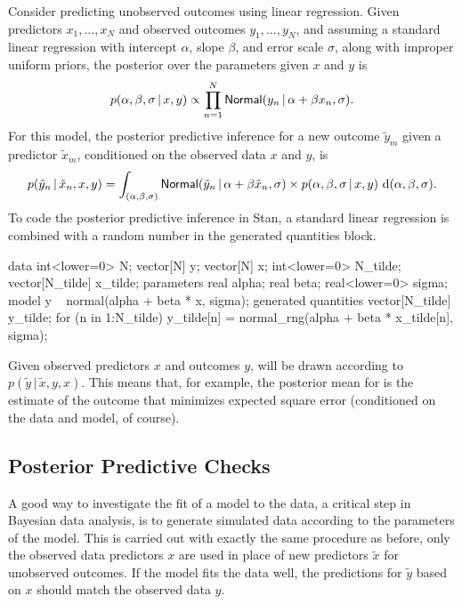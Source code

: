 Consider predicting unobserved outcomes using linear
regression.  Given predictors $x_1, \ldots, x_N$ and observed outcomes
$y_1,\ldots,y_N$, and assuming a standard linear regression with
intercept $\alpha$, slope $\beta$, and error scale $\sigma$, along with
improper uniform priors, the posterior over the parameters given $x$
and $y$ is
%
\[
p(\alpha, \beta, \sigma \, | \, x, y) 
\propto 
\prod_{n=1}^N 
  \distro{Normal}(y_n \, | \, \alpha + \beta x_n, \sigma).
\]
%
For this model, the posterior predictive inference for a new outcome
$\tilde{y}_m$ given a predictor $\tilde{x}_m$, conditioned on the
observed data $x$ and $y$, is
\[
p(\tilde{y}_n \, | \, \tilde{x}_n, x, y)
= \int_{(\alpha,\beta,\sigma)}
  \distro{Normal}(\tilde{y}_n \, | \, \alpha + \beta \tilde{x}_n, \sigma)
  \times
  p(\alpha, \beta, \sigma \, | \, x, y) 
  \
  \mathrm{d}(\alpha,\beta,\sigma).
\]
%
To code the posterior predictive inference in Stan, a standard linear
regression is combined with a random number in the generated
quantities block.
%
\begin{stancode}
data {
  int<lower=0> N;
  vector[N] y;
  vector[N] x;
  int<lower=0> N_tilde;
  vector[N_tilde] x_tilde;
}
parameters {
  real alpha;
  real beta;
  real<lower=0> sigma;
}
model {
  y ~ normal(alpha + beta * x, sigma);
}
generated quantities {
  vector[N_tilde] y_tilde;
  for (n in 1:N_tilde)
    y_tilde[n] = normal_rng(alpha + beta * x_tilde[n], sigma);
}
\end{stancode}
%
Given observed predictors $x$ and outcomes $y$,  will
be drawn according to $p(\tilde{y} \, | \, \tilde{x}, y, x)$.  This
means that, for example, the posterior mean for \code{y\_tilde} is the
estimate of the outcome that minimizes expected square error
(conditioned on the data and model, of course).

\subsection{Posterior Predictive Checks}

A good way to investigate the fit of a model to the data, a critical
step in Bayesian data analysis, is to generate simulated data
according to the parameters of the model.  This is carried out with
exactly the same procedure as before, only the observed data
predictors $x$ are used in place of new predictors $\tilde{x}$ for
unobserved outcomes.  If the model fits the data well, the predictions
for $\tilde{y}$ based on $x$ should match the observed data $y$.

